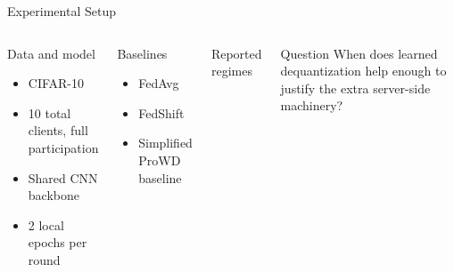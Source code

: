 \documentclass[aspectratio=169,11pt]{beamer}
\begin{document}
\begin{frame}{Experimental Setup}
\begin{columns}[T,totalwidth=\textwidth]
\begin{block}{Data and model}
\begin{itemize}
  \item CIFAR-10
  \item 10 total clients, full participation
  \item Shared CNN backbone
  \item 2 local epochs per round
\end{itemize}
\end{block}

\vspace{0.5em}
\begin{block}{Baselines}
\begin{itemize}
  \item FedAvg
  \item FedShift
  \item Simplified ProWD baseline
\end{itemize}
\end{block}

\begin{block}{Reported regimes}
\small
{}
\end{block}

\vspace{0.5em}
\begin{block}{Question}
When does learned dequantization help enough to justify the extra server-side
machinery?
\end{block}
\end{columns}
\end{frame}
\end{document}
